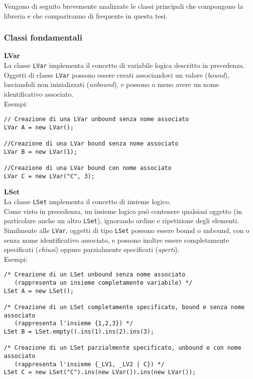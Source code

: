 Vengono di seguito brevemente analizzate le classi principali che compongono la libreria e che compariranno di frequente in questa tesi.\\

\subsubsection{Classi fondamentali}

\textbf{LVar}\\
La classe \texttt{LVar} implementa il concetto di variabile logica descritto in precedenza.\\
Oggetti di classe \texttt{LVar} possono essere creati associandovi un valore (\emph{bound}), lasciandoli non inizializzati (\emph{unbound}), e possono o meno avere un nome identificativo associato.\\
Esempi:\\
\begin{lstlisting}
// Creazione di una LVar unbound senza nome associato
LVar A = new LVar();

//Creazione di una LVar bound senza nome associato
LVar B = new LVar(1);

//Creazione di una LVar bound con nome associato
LVar C = new LVar("C", 3);
\end{lstlisting}

\textbf{LSet}\\
La classe \texttt{LSet} implementa il concetto di insieme logico.\\
Come visto in precedenza, un insieme logico può contenere qualsiasi oggetto (in particolare anche un altro \texttt{LSet}), ignorando ordine e ripetizione degli elementi.\\
Similmente alle \texttt{LVar}, oggetti di tipo \texttt{LSet} possono essere bound o unbound, con o senza nome identificativo associato, e possono inoltre essere completamente specificati (\emph{chiusi}) oppure parzialmente specificati (\emph{aperti}).\\
Esempi:\\

\begin{lstlisting}
/* Creazione di un LSet unbound senza nome associato
   (rappresenta un insieme completamente variabile) */
LSet A = new LSet();

/* Creazione di un LSet completamente specificato, bound e senza nome associato
   (rappresenta l'insieme {1,2,3}) */
LSet B = LSet.empty().ins(1).ins(2).ins(3);

/* Creazione di un LSet parzialmente specificato, unbound e con nome associato
   (rappresenta l'insieme {_LV1, _LV2 | C}) */
LSet C = new LSet("C").ins(new LVar()).ins(new LVar());
\end{lstlisting}

